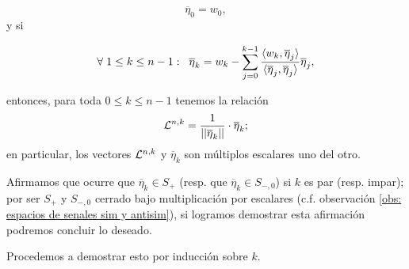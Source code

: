 \begin{equation}
\label{eq3: 19En}
\overline{\eta}_{0}= w_{0},
\end{equation}
y si

\begin{equation}
\label{eq3: 19En}
\forall \hspace{0.1cm} 1 \leq k \leq n-1: 
\hspace{0.2cm}
\overline{\eta}_{k}= w_{k}-
\suma{j=0}{k-1}{
\frac{\langle w_{k}, \overline{\eta}_{j} \rangle}
{\langle \overline{\eta}_{j}, \overline{\eta}_{j} \rangle}\overline{\eta}_{j},
}
\end{equation}


\noindent
entonces, para toda $0 \leq k \leq n-1$ tenemos la relación 
\[
\mathcal{L}^{n,k}= \frac{1}{||\overline{\eta}_{k}||} \cdot \overline{\eta}_{k};
\]
en particular, los vectores $\mathcal{L}^{n,k}$ y 
$\overline{\eta}_{k}$ son múltiplos escalares uno del otro.

Afirmamos que ocurre que
$\overline{\eta}_{k} \in S_{+}$ (resp. que
$\overline{\eta}_{k} \in S_{-,0}$) si $k$ es par
(resp. impar); por ser $S_{+}$
y $S_{-,0}$ cerrado bajo multiplicación
por escalares (c.f. observación 
\ref{obs: espacios de senales sim y antisim}),
si logramos demostrar esta afirmación podremos concluir lo deseado.


Procedemos a demostrar esto por inducción sobre $k$.

